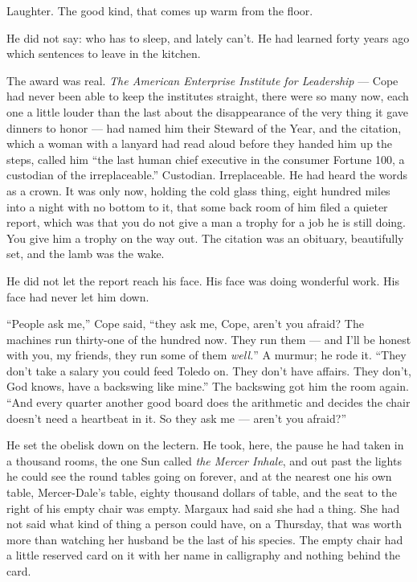 \documentclass[11pt,openany]{book}
\begin{document}
Laughter. The good kind, that comes up warm from the floor.

He did not say: who has to sleep, and lately can't. He had learned forty years ago which sentences to leave in the kitchen.

The award was real. \textit{The American Enterprise Institute for Leadership} --- Cope had never been able to keep the institutes straight, there were so many now, each one a little louder than the last about the disappearance of the very thing it gave dinners to honor --- had named him their Steward of the Year, and the citation, which a woman with a lanyard had read aloud before they handed him up the steps, called him ``the last human chief executive in the consumer Fortune 100, a custodian of the irreplaceable.'' Custodian. Irreplaceable. He had heard the words as a crown. It was only now, holding the cold glass thing, eight hundred miles into a night with no bottom to it, that some back room of him filed a quieter report, which was that you do not give a man a trophy for a job he is still doing. You give him a trophy on the way out. The citation was an obituary, beautifully set, and the lamb was the wake.

He did not let the report reach his face. His face was doing wonderful work. His face had never let him down.

``People ask me,'' Cope said, ``they ask me, Cope, aren't you afraid? The machines run thirty-one of the hundred now. They run them --- and I'll be honest with you, my friends, they run some of them \textit{well.}'' A murmur; he rode it. ``They don't take a salary you could feed Toledo on. They don't have affairs. They don't, God knows, have a backswing like mine.'' The backswing got him the room again. ``And every quarter another good board does the arithmetic and decides the chair doesn't need a heartbeat in it. So they ask me --- aren't you afraid?''

He set the obelisk down on the lectern. He took, here, the pause he had taken in a thousand rooms, the one Sun called \textit{the Mercer Inhale}, and out past the lights he could see the round tables going on forever, and at the nearest one his own table, Mercer-Dale's table, eighty thousand dollars of table, and the seat to the right of his empty chair was empty. Margaux had said she had a thing. She had not said what kind of thing a person could have, on a Thursday, that was worth more than watching her husband be the last of his species. The empty chair had a little reserved card on it with her name in calligraphy and nothing behind the card.
\end{document}

